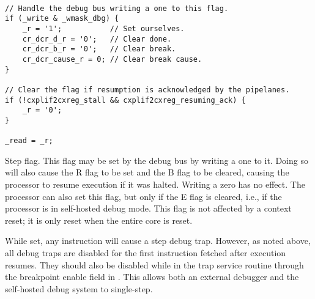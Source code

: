 \declaration{}
\implementation{}
\begin{lstlisting}

// Handle the debug bus writing a one to this flag.
if (_write & _wmask_dbg) {
    _r = '1';           // Set ourselves.
    cr_dcr_d_r = '0';   // Clear done.
    cr_dcr_b_r = '0';   // Clear break.
    cr_dcr_cause_r = 0; // Clear break cause.
}

// Clear the flag if resumption is acknowledged by the pipelanes.
if (!cxplif2cxreg_stall && cxplif2cxreg_resuming_ack) {
    _r = '0';
}

_read = _r;
\end{lstlisting}

Step flag. This flag may be set by the debug bus by writing a one to it. Doing
so will also cause the R flag to be set and the B flag to be cleared, causing
the processor to resume execution if it was halted. Writing a zero has no
effect. The processor can also set this flag, but only if the E flag is cleared,
i.e., if the processor is in self-hosted debug mode. This flag is not affected 
by a context reset; it is only reset when the entire core is reset.

While set, any instruction will cause a step debug trap. However, as noted
above, all debug traps are disabled for the first instruction fetched after
execution resumes. They should also be disabled while in the trap service
routine through the breakpoint enable field in . This allows both an
external debugger and the self-hosted debug system to single-step.

